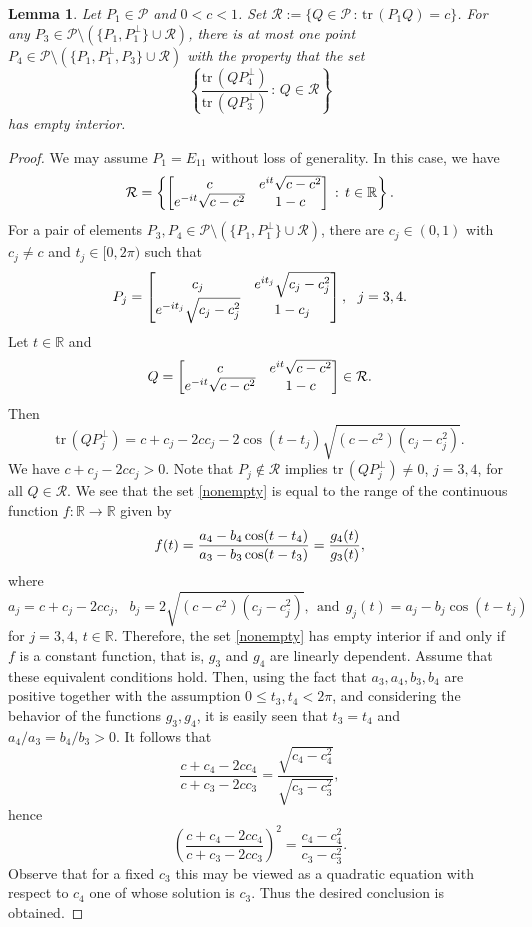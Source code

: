 \documentclass[10pt]{amsart}
\newtheorem{lemma}[theorem]{Lemma}
\theoremstyle{definition}
\theoremstyle{remark}
\numberwithin{subsection}{section}
\numberwithin{equation}{section}
\newcommand\cP{{\mathcal{P}}}
\newcommand\bR{{\mathbb{R}}}
\begin{document}
\begin{lemma}\label{134}
Let $P_1\in \cP$ and $0<c<1$. 
Set $\mathcal{R}:=\{Q\in \cP\,:\, \mathrm{tr}\,(P_1Q)=c\}$. 
For any $P_3\in \cP\setminus (\{P_1, P_1^\perp\}\cup\mathcal{R})$, there is at most one point $P_4\in \cP\setminus (\{P_1, P_1^\perp, P_3\}\cup\mathcal{R})$ with the property that the set
\begin{equation}\label{nonempty}
\left\{ \frac{\mathrm{tr}\, (QP_4^\perp)}{\mathrm{tr}\,(QP_3^\perp)}\,:\, Q\in \mathcal{R}\right\}
\end{equation}
has empty interior.
\end{lemma}
\begin{proof}
We may assume $P_1=E_{11}$ without loss of generality.
In this case, we have 
\[
\mathcal{R}=\left\{\left[ \begin{matrix} c & e^{it}\sqrt{c-c^2}  \cr e^{-it}\sqrt{c-c^2} & 1-c \cr \end{matrix} \right]\,:\, t\in \mathbb{R}\right\}.
\]
For a pair of elements $P_3, P_4\in  \cP\setminus(\{P_1, P_1^\perp\}\cup\mathcal{R})$, 
there are  $c_j \in (0, 1)$ with $c_j\neq c$ and $t_j \in [0,2\pi)$ such that 
\[
P_j=\left[ \begin{matrix} c_j & e^{it_j}\sqrt{c_j-c_j^2}  \cr e^{-it_j}\sqrt{c_j-c_j^2} & 1-c_j \cr \end{matrix} \right], \ \ j=3,4.
\]
Let $t\in \mathbb{R}$ and
\[
Q=\left[ \begin{matrix} c & e^{it}\sqrt{c-c^2}  \cr e^{-it}\sqrt{c-c^2} & 1-c \cr \end{matrix} \right] \in \mathcal{R}.
\]
Then
\[
\mathrm{tr}\, (QP_j^\perp) = c+c_j-2cc_j-2\cos(t-t_j)\sqrt{(c-c^2)(c_j-c_j^2)}.
\]
We have $c+c_j-2cc_j>0$. 
Note that $P_j\notin \mathcal{R}$ implies $\mathrm{tr}\, (QP_j^\perp) \not=0$, $j=3,4$, for all $Q \in \mathcal{R}$. We see that the set \eqref{nonempty} is equal to the range of the continuous function $f\colon \mathbb{R} \to \mathbb{R}$ given by
\[
f(t) = { a_4 - b_4 \cos ( t-t_4) \over a_3 - b_3 \cos ( t-t_3) } = { g_4(t) \over g_3(t) },
\]
where
\[
a_j = c+ c_j - 2cc_j,\ \ \  b_j = 2 \sqrt{(c-c^2)(c_j-c_j^2)}, \ \ \text{and}\ \  g_j(t)=a_j - b_j \cos ( t-t_j)
\]
for $j=3,4$, $t\in \bR$.
Therefore, the set \eqref{nonempty} has empty interior if and only if $f$ is a constant function, that is, $g_3$ and $g_4$ are linearly dependent. 
Assume that these equivalent conditions hold. Then, using the fact that $a_3, a_4, b_3, b_4$ are positive together with the assumption $0\leq t_3 , t_4 <2\pi$, and considering the behavior of the functions $g_3, g_4$, it is easily seen that $t_3=t_4$ and $a_4/a_3=b_4/b_3>0$.
It follows that
\[
\frac{c+c_4-2cc_4}{c+c_3-2cc_3}=\frac{\sqrt{c_4-c_4^2}}{\sqrt{c_3-c_3^2}},
\]
hence
\[
\left(\frac{c+c_4-2cc_4}{c+c_3-2cc_3}\right)^2=\frac{c_4-c_4^2}{c_3-c_3^2}.
\]
Observe that for a fixed $c_3$ this may be viewed as a quadratic equation with respect to $c_4$ one of whose solution is $c_3$. 
Thus the desired conclusion is obtained.
\end{proof}
\end{document}
